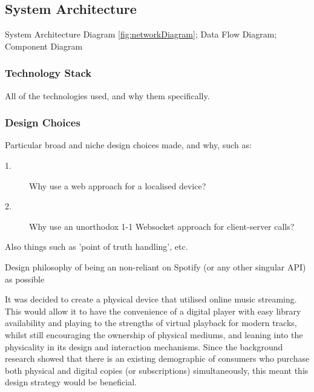         \subsection{System Architecture} %
    
            \begin{temp}
                System Architecture Diagram \ref{fig:networkDiagram}; Data Flow Diagram; Component Diagram
            \end{temp}
        
            \subsubsection{Technology Stack}
    
                \begin{temp}
                    All of the technologies used, and why them specifically.
                \end{temp}
        
            \subsubsection{Design Choices}
                \begin{temp}
                    Particular broad and niche design choices made, and why, such as:
                    \begin{description}
                        \item[1.] Why use a web approach for a localised device?
                        \item[2.] Why use an unorthodox 1-1 Websocket approach for client-server calls?
                    \end{description}
                    Also things such as 'point of truth handling', etc.
                    
                    Design philosophy of being an non-reliant on Spotify (or any other singular API) as possible
                \end{temp}
    
                It was decided to create a physical device that utilised online music streaming. This would allow it to have the convenience of a digital player with easy library availability and playing to the strengths of virtual playback for modern tracks, whilst still encouraging the ownership of physical mediums, and leaning into the physicality in its design and interaction mechanisms. Since the background research showed that there is an existing demographic of consumers who purchase both physical and digital copies (or subscriptions) simultaneously, this meant this design strategy would be beneficial. 
    
